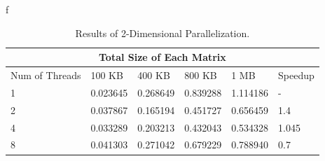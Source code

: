 f\documentclass[12pt]{article}
\numberwithin{equation}{section}
\numberwithin{table}{section}
\numberwithin{figure}{section}
\begin{document}
\def\arraystretch{1.3}
\begin{table}
	\centering
	\begin{tabular}{ |p{3cm}||p{2cm}|p{2cm}|p{2cm}|p{2cm}|p{1.5cm}|  }
		
		\hline
		\multicolumn{6}{|c|}{Total Size of Each Matrix} \\
		\hline
	 Num of Threads & 100 KB & 400 KB & 800 KB & 1 MB & Speedup\\
		\hline
		1   & 0.023645 & 0.268649 & 0.839288 & 1.114186 &   -\\
		2   & 0.037867 & 0.165194 & 0.451727 & 0.656459 &   1.4\\
		4   & 0.033289 & 0.203213 & 0.432043 & 0.534328 &   1.045\\
		8   & 0.041303 & 0.271042 & 0.679229 & 0.788940 &   0.7\\
		\hline
	\end{tabular}
	\caption{Results of 2-Dimensional Parallelization.}
	\label{figsolplot}
\end{table}
\end{document}
